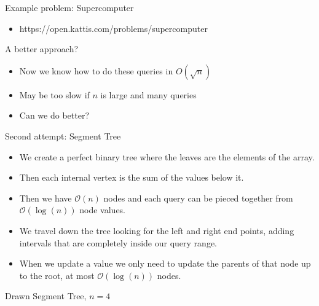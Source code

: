 \documentclass{beamer}
\begin{document}
\begin{frame}[plain]{Example problem: Supercomputer}
    \begin{itemize}
        \item https://open.kattis.com/problems/supercomputer
    \end{itemize}
\end{frame}

\begin{frame}[plain]{A better approach?}
    \begin{itemize}
        \item<1-> Now we know how to do these queries in $O(\sqrt{n})$
        \item<2-> May be too slow if $n$ is large and many queries
        \vspace{10pt}
        \item<3-> Can we do better?
    \end{itemize}
\end{frame}

\begin{frame}{Second attempt: Segment Tree}
    \begin{itemize}
        \item<1-> We create a perfect binary tree where the leaves are the elements of the array.
        \item<2-> Then each internal vertex is the sum of the values below it.
        \item<3-> Then we have $\mathcal{O}(n)$ nodes and each query can be pieced together from $\mathcal{O}(\log(n))$ node values.
        \item<4-> We travel down the tree looking for the left and right end points, adding intervals that are completely inside our query range.
        \item<5-> When we update a value we only need to update the parents of that node up to the root, at most $\mathcal{O}(\log(n))$ nodes.
    \end{itemize}
\end{frame}

\begin{frame}[plain]{Drawn Segment Tree, $n = 4$}
	\begin{center}
    \end{center}
\end{frame}
\end{document}
